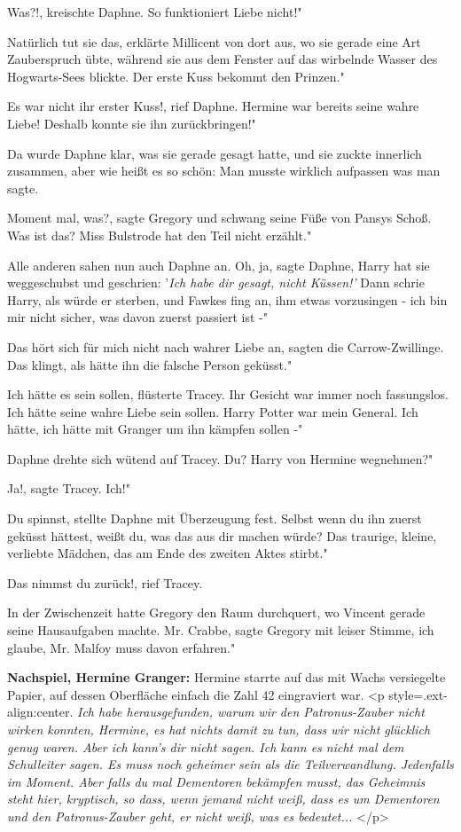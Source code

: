 \glqq Was?!\grqq{}, kreischte Daphne. \glqq So funktioniert Liebe nicht!"

\glqq Natürlich tut sie das\grqq{}, erklärte Millicent von dort aus, wo sie
gerade eine Art Zauberspruch übte, während sie aus dem Fenster auf das wirbelnde
Wasser des Hogwarts-Sees blickte. \glqq Der erste Kuss bekommt den Prinzen."

\glqq Es war nicht ihr erster Kuss!\grqq{}, rief Daphne. \glqq Hermine war
bereits seine wahre Liebe! Deshalb konnte sie ihn zurückbringen!"

Da wurde Daphne klar, was sie gerade gesagt hatte, und sie zuckte innerlich
zusammen, aber wie heißt es so schön: Man musste wirklich aufpassen was man
sagte.

\glqq Moment mal, was?\grqq{}, sagte Gregory und schwang seine Füße von Pansys
Schoß. \glqq Was ist das? Miss Bulstrode hat den Teil nicht erzählt."

Alle anderen sahen nun auch Daphne an. \glqq Oh, ja\grqq{}, sagte Daphne, \glqq
Harry hat sie weggeschubst und geschrien: '\emph{Ich habe dir gesagt, nicht
Küssen!' }Dann schrie Harry, als würde er sterben, und Fawkes fing an, ihm etwas
vorzusingen - ich bin mir nicht sicher, was davon zuerst passiert ist -"

\glqq Das hört sich für mich nicht nach wahrer Liebe an\grqq{}, sagten die
Carrow-Zwillinge. \glqq Das klingt, als hätte ihn die falsche Person geküsst."

\glqq Ich hätte es sein sollen\grqq{}, flüsterte Tracey. Ihr Gesicht war immer
noch fassungslos. \glqq Ich hätte seine wahre Liebe sein sollen. Harry Potter
war mein General. Ich hätte, ich hätte mit Granger um ihn kämpfen sollen -"

Daphne drehte sich wütend auf Tracey. \glqq Du? Harry von Hermine wegnehmen?"

\glqq Ja!\grqq{}, sagte Tracey. \glqq Ich!"

\glqq Du spinnst\grqq{}, stellte Daphne mit Überzeugung fest. \glqq Selbst wenn
du ihn zuerst geküsst hättest, weißt du, was das aus dir machen würde? Das
traurige, kleine, verliebte Mädchen, das am Ende des zweiten Aktes stirbt."

\glqq Das nimmst du zurück!\grqq{}, rief Tracey.

In der Zwischenzeit hatte Gregory den Raum durchquert, wo Vincent gerade seine
Hausaufgaben machte. \glqq Mr. Crabbe\grqq{}, sagte Gregory mit leiser Stimme,
\glqq ich glaube, Mr. Malfoy muss davon erfahren."

\textbf{Nachspiel, Hermine Granger:}
Hermine starrte auf das mit Wachs versiegelte Papier, auf dessen Oberfläche
einfach die Zahl 42 eingraviert war. <p style=\grqq{}.ext-align:center\grqq{}.
\emph{Ich habe herausgefunden, warum wir den Patronus-Zauber nicht wirken
konnten, Hermine, es hat nichts damit zu tun, dass wir nicht glücklich genug
waren. Aber ich kann's dir nicht sagen. Ich kann es nicht mal dem Schulleiter
sagen. Es muss noch geheimer sein als die Teilverwandlung. Jedenfalls im Moment.
Aber falls du mal Dementoren bekämpfen musst, das Geheimnis steht hier,
kryptisch, so dass, wenn jemand nicht weiß, dass es um Dementoren und den
Patronus-Zauber geht, er nicht weiß, was es bedeutet... }</p>

